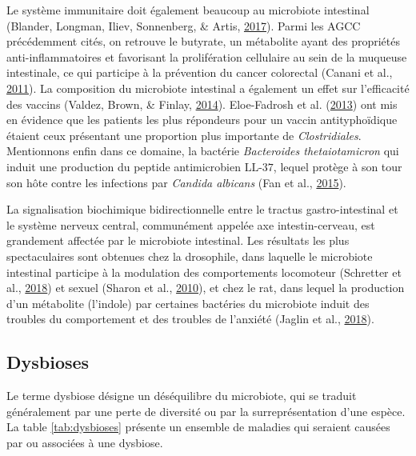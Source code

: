 \documentclass[12pt,a4paper]{reedthesis}
\theoremstyle{definition}
\theoremstyle{definition}
\theoremstyle{definition}
\theoremstyle{remark}
\begin{document}
Le système immunitaire doit également beaucoup au microbiote intestinal (Blander, Longman, Iliev, Sonnenberg, \& Artis, \protect\hyperlink{ref-blander2017regulation}{2017}). Parmi les AGCC précédemment cités, on retrouve le butyrate, un métabolite ayant des propriétés anti-inflammatoires et favorisant la prolifération cellulaire au sein de la muqueuse intestinale, ce qui participe à la prévention du cancer colorectal (Canani et al., \protect\hyperlink{ref-canani2011potential}{2011}).
La composition du microbiote intestinal a également un effet sur l'efficacité des vaccins (Valdez, Brown, \& Finlay, \protect\hyperlink{ref-valdez2014influence}{2014}). Eloe-Fadrosh et al. (\protect\hyperlink{ref-eloe2013impact}{2013}) ont mis en évidence que les patients les plus répondeurs pour un vaccin antityphoïdique étaient ceux présentant une proportion plus importante de \emph{Clostridiales}. Mentionnons enfin dans ce domaine, la bactérie \emph{Bacteroides thetaiotamicron} qui induit une production du peptide antimicrobien \(\text{LL-37}\), lequel protège à son tour son hôte contre les infections par \emph{Candida albicans} (Fan et al., \protect\hyperlink{ref-fan2015activation}{2015}).

La signalisation biochimique bidirectionnelle entre le tractus gastro-intestinal et le système nerveux central, communément appelée axe intestin-cerveau, est grandement affectée par le microbiote intestinal. Les résultats les plus spectaculaires sont obtenues chez la drosophile, dans laquelle le microbiote intestinal participe à la modulation des comportements locomoteur (Schretter et al., \protect\hyperlink{ref-schretter2018gut}{2018}) et sexuel (Sharon et al., \protect\hyperlink{ref-sharon2010commensal}{2010}), et chez le rat, dans lequel la production d'un métabolite (l'indole) par certaines bactéries du microbiote induit des troubles du comportement et des troubles de l'anxiété (Jaglin et al., \protect\hyperlink{ref-jaglin2018indole}{2018}).

\hypertarget{dysbioses}{%
\subsection{Dysbioses}\label{dysbioses}}

Le terme dysbiose désigne un déséquilibre du microbiote, qui se traduit généralement par une perte de diversité ou par la surreprésentation d'une espèce. La table \ref{tab:dysbioses} présente un ensemble de maladies qui seraient causées par ou associées à une dysbiose.
\end{document}
